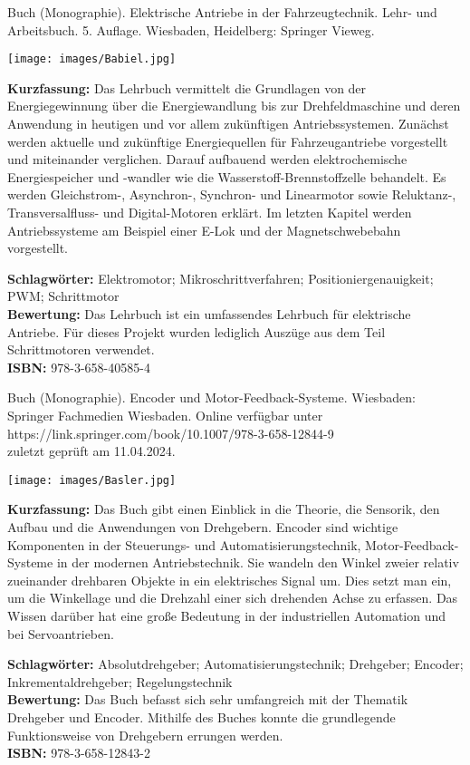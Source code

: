 {
Buch (Monographie). Elektrische Antriebe in der Fahrzeugtechnik. Lehr- und Arbeitsbuch.
5. Auflage. Wiesbaden, Heidelberg: Springer Vieweg.	
\begin{minipage}{0.38\textwidth}
	\texttt{[image: images/Babiel.jpg]}
\end{minipage}
\hfill
\begin{minipage}{0.6\textwidth}
\textbf{Kurzfassung:}
Das Lehrbuch vermittelt die Grundlagen von der Energiegewinnung über die Energiewandlung bis zur Drehfeldmaschine und deren Anwendung in heutigen und vor allem zukünftigen Antriebssystemen. Zunächst werden aktuelle und zukünftige Energiequellen für Fahrzeugantriebe vorgestellt und miteinander verglichen. Darauf aufbauend werden elektrochemische Energiespeicher und -wandler wie die Wasserstoff-Brennstoffzelle behandelt. Es werden Gleichstrom-, Asynchron-, Synchron- und Linearmotor sowie Reluktanz-, Transversalfluss- und Digital-Motoren erklärt. Im letzten Kapitel werden Antriebssysteme am Beispiel einer E-Lok und der Magnetschwebebahn vorgestellt.
\end{minipage}
\textbf{Schlagwörter:}
Elektromotor; Mikroschrittverfahren; Positioniergenauigkeit; PWM; Schrittmotor
\\ \textbf{Bewertung:}
Das Lehrbuch ist ein umfassendes Lehrbuch für elektrische Antriebe. Für dieses Projekt wurden lediglich Auszüge aus dem Teil \glqq Schrittmotoren \grqq verwendet.
\\ \textbf{ISBN:}
978-3-658-40585-4
}

{
Buch (Monographie). Encoder und Motor-Feedback-Systeme.
Wiesbaden: Springer Fachmedien Wiesbaden. Online verfügbar unter https://link.springer.com/book/10.1007/978-3-658-12844-9 \\
zuletzt geprüft am 11.04.2024.	\\
\begin{minipage}{0.38\textwidth}
	\texttt{[image: images/Basler.jpg]}
\end{minipage}
\hfill
\begin{minipage}{0.6\textwidth}
\textbf{Kurzfassung:}
Das Buch gibt einen Einblick in die Theorie, die Sensorik, den Aufbau und die Anwendungen von Drehgebern. Encoder sind wichtige Komponenten in der Steuerungs- und Automatisierungstechnik, Motor-Feedback-Systeme in der modernen Antriebstechnik. Sie wandeln den Winkel zweier relativ zueinander drehbaren Objekte in ein elektrisches Signal um. Dies setzt man ein, um die Winkellage und die Drehzahl einer sich drehenden Achse zu erfassen. Das Wissen darüber hat eine große Bedeutung in der industriellen Automation und bei Servoantrieben.	
\end{minipage}
\textbf{Schlagwörter:}
Absolutdrehgeber; Automatisierungstechnik; Drehgeber; Encoder; Inkrementaldrehgeber; Regelungstechnik
\\ \textbf{Bewertung:}
Das Buch befasst sich sehr umfangreich mit der Thematik Drehgeber und Encoder. Mithilfe des Buches konnte die grundlegende Funktionsweise von Drehgebern errungen werden.
\\ \textbf{ISBN:}
978-3-658-12843-2
}

